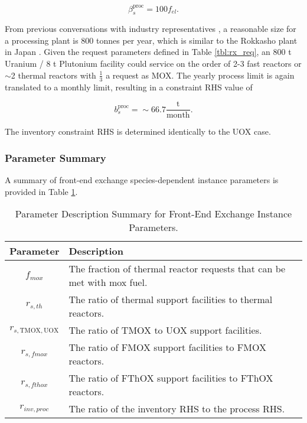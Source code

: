 \begin{equation}
\beta^{\text{proc}}_s = 100 f_{el}. 
\end{equation}

From previous conversations with industry representatives \cite{murraycomm}, a
reasonable size for a processing plant is 800 tonnes per year, which is similar
to the Rokkasho plant in Japan \cite{heinonen2010}. Given the request
parameters defined in Table \ref{tbl:rx_req}, an 800 t Uranium / 8 t Plutonium
facility could service on the order of 2-3 fast reactors or $\sim$2 thermal
reactors with $\frac{1}{3}$ a request as MOX. The yearly process limit is again
translated to a monthly limit, resulting in a constraint RHS value of

\begin{equation}
b^{\text{proc}}_s = \sim 66.7 \frac{\text{t}}{\text{month}}.
\end{equation}

The inventory constraint RHS is determined identically to the UOX case.

\subsubsection{Parameter Summary}\label{method:setup:front:sum}

A summary of front-end exchange species-dependent instance parameters is provided
in Table \ref{tbl:front_params}.

\begin{table}[h!]
\centering
\caption{Parameter Description Summary for Front-End Exchange Instance Parameters.}
\label{tbl:front_params}
\begin{tabularx}{\columnwidth-10pt}{|c|X|} %
\hline
Parameter    & 
Description
\\ \hline
$f_{mox}$     & 
The fraction of thermal reactor requests that can be met with mox fuel.
\\ \hline
$r_{s, th}$ & 
The ratio of thermal support facilities to thermal reactors.  
\\ \hline
$r_{s, \text{TMOX}, \text{UOX}}$ & 
The ratio of TMOX to UOX support facilities.
\\ \hline
$r_{s, fmox}$ & 
The ratio of FMOX support facilities to FMOX reactors.
\\ \hline
$r_{s, fthox}$ & 
The ratio of FThOX support facilities to FThOX reactors.
\\ \hline
$r_{inv, proc}$   & 
The ratio of the inventory RHS to the process RHS.
\\ \hline
\end{tabularx}
\end{table}

